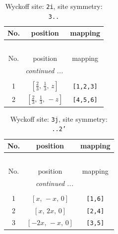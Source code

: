 \documentclass[fleqn,8pt]{jsarticle}
\begin{document}
\begin{longtable}{ccc}
\caption{Wyckoff site: {\tt 2i}, site symmetry: {\tt 3..}}
 \\
 \hline \hline
No. & position & mapping \\ \hline \endfirsthead

\multicolumn{2}{l}{\tablename\ \thetable{}} \\
 \hline \hline
No. & position & mapping \\ \hline \endhead

 \hline \hline
\multicolumn{2}{r}{\footnotesize\it continued ...} \\ \endfoot

 \hline \hline
\multicolumn{2}{r}{} \\ \endlastfoot

1 & $\left[ \frac{2}{3},\, \frac{1}{3},\, z \right]$ & {\tt [1,2,3]} \\ \hline
2 & $\left[ \frac{2}{3},\, \frac{1}{3},\, - z \right]$ & {\tt [4,5,6]} \\
\end{longtable}
\renewcommand{\arraystretch}{1.2}
\begin{longtable}{ccc}
\caption{Wyckoff site: {\tt 3j}, site symmetry: {\tt ..2'}}
 \\
 \hline \hline
No. & position & mapping \\ \hline \endfirsthead

\multicolumn{2}{l}{\tablename\ \thetable{}} \\
 \hline \hline
No. & position & mapping \\ \hline \endhead

 \hline \hline
\multicolumn{2}{r}{\footnotesize\it continued ...} \\ \endfoot

 \hline \hline
\multicolumn{2}{r}{} \\ \endlastfoot

1 & $\left[ x,\, - x,\, 0 \right]$ & {\tt [1,6]} \\ \hline
2 & $\left[ x,\, 2 x,\, 0 \right]$ & {\tt [2,4]} \\ \hline
3 & $\left[ - 2 x,\, - x,\, 0 \right]$ & {\tt [3,5]} \\
\end{longtable}
\renewcommand{\arraystretch}{1.2}
\end{document}
